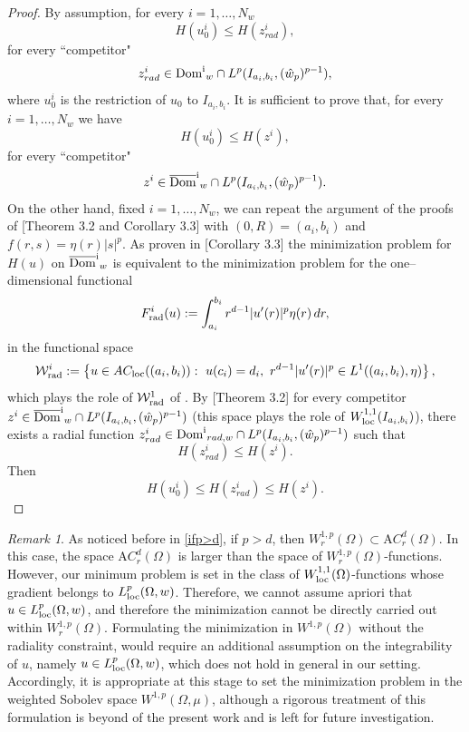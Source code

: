 \documentclass[11pt,leqno]{amsart}
\theoremstyle{remark}
\newtheorem{oss}[teo]{Remark}
\theoremstyle{definition}
\theoremstyle{definition}
\newcommand{\wstar}{{\hat w}}
\begin{document}
\begin{proof} 
By assumption, for every $i=1,\dots,N_w$ 
$$
H(u^i_0)\leq H(z^i_{rad}),
$$
for every ``competitor" $$z^i_{rad}\in {\rm{{Dom}^i}}_{w}\cap L^{p}(I_{a_{i},b_{i}},(\wstar_{p})^{p-1}),$$
where $u^i_0$ is the restriction of $u_0$ to $I_{a_{i},b_{i}}$.
It is sufficient to prove  that, for every $i=1,\dots,N_w$  we have
$$
H(u^i_0)\leq H(z^i),
$$
for every ``competitor" $$z^i\in {\rm{\overline{Dom}^i}}_{w}\cap L^{p}(I_{a_{i},b_{i}},(\wstar_{p})^{p-1}).$$
On the other hand, fixed $i=1,\dots,N_w$, we can repeat the argument of the proofs of \cite{CrastaMalusa}[Theorem 3.2 and Corollary 3.3] with 
$(0,R)=(a_i,b_i)$ and $f(r,s)=\eta(r)|s|^p$. 
As proven in \cite{CrastaMalusa}[Corollary 3.3] the minimization problem for $H(u)$ on ${\rm{\overline{Dom}^i}}_{w}$
is equivalent to the minimization problem for the one–dimensional functional
$$F^i_{\rm{rad}}(u)
:=
\int_{a_i}^{b_i} r^{d-1} |u'(r)|^p\eta(r)\,dr,
$$
in the functional space
$$
{\mathcal{W}}^{i}_{\rm{rad}}:=\left\{u\in AC_{\rm{loc}}((a_i,b_i)):\ u(c_i)=d_i,\  r^{d-1}|u'(r)|^p\in L^1((a_i,b_i),\eta)
\right\},
$$
which plays the role of ${\mathcal{W}}^{1}_{\rm{rad}}$ of \cite{CrastaMalusa}.
By \cite{CrastaMalusa}[Theorem 3.2] for every competitor $z^i\in {\rm{\overline{Dom}^i}}_{w}\cap L^{p}(I_{a_{i},b_{i}},(\wstar_{p})^{p-1})$ (this space plays the role of $W_{{\rm loc}}^{1,1}(I_{a_i,b_i})$), there exists a radial function $z^i_{rad}\in {\rm{{Dom}^i}}_{rad,w}\cap L^{p}(I_{a_{i},b_{i}},(\wstar_{p})^{p-1})$ such that 
$$
H(z^i_{rad})\leq H(z^i).
$$
Then 
$$
H(u^i_0)\leq H(z^i_{rad})\leq H(z^i).
$$
\end{proof}
\begin{oss}
As noticed before in \eqref{ifp>d}, if $p>d$, then $W_{r}^{1,p}(\Omega) \subset {\mathrm AC}_{r}^{d}(\Omega)$. In this case, the space ${\mathrm AC}_{r}^{d}(\Omega)$ is larger than the space of $W_{r}^{1,p}(\Omega)$-functions. However, our minimum problem is set in the class of $W_{{\rm loc}}^{1,1}(\Omega)$-functions whose gradient belongs to $L_{{\rm loc}}^{p}(\Omega,w)$. Therefore, we cannot assume apriori that $u\in L_{{\rm loc}}^{p}(\Omega,w)$, and therefore the minimization cannot be directly carried out within $W_{r}^{1,p}(\Omega)$. Formulating the minimization in $W^{1,p}(\Omega)$ without the radiality constraint, would require an additional assumption on the integrability of $u$, namely $u\in L_{{\rm loc}}^{p}(\Omega,w)$, which does not hold in general in our setting. Accordingly, it is appropriate at this stage to set the minimization problem in the weighted Sobolev space $W^{1,p}(\Omega,\mu)$, although a rigorous treatment of this formulation is beyond of the present work and is left for future investigation.
\end{oss}
\end{document}
